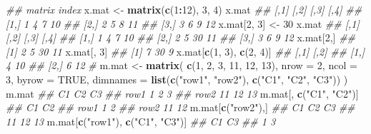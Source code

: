 \documentclass[
]{book}
\newenvironment{Shaded}{\begin{snugshade}}{\end{snugshade}}
\newcommand{\CommentTok}[1]{\textcolor[rgb]{0.56,0.35,0.01}{\textit{#1}}}
\newcommand{\DataTypeTok}[1]{\textcolor[rgb]{0.13,0.29,0.53}{#1}}
\newcommand{\DecValTok}[1]{\textcolor[rgb]{0.00,0.00,0.81}{#1}}
\newcommand{\KeywordTok}[1]{\textcolor[rgb]{0.13,0.29,0.53}{\textbf{#1}}}
\newcommand{\NormalTok}[1]{#1}
\newcommand{\OperatorTok}[1]{\textcolor[rgb]{0.81,0.36,0.00}{\textbf{#1}}}
\newcommand{\OtherTok}[1]{\textcolor[rgb]{0.56,0.35,0.01}{#1}}
\newcommand{\StringTok}[1]{\textcolor[rgb]{0.31,0.60,0.02}{#1}}
\begin{document}
\begin{Shaded}
\begin{Highlighting}[]
\CommentTok{\#\# matrix index}
\NormalTok{x.mat \textless{}{-}}\StringTok{ }\KeywordTok{matrix}\NormalTok{(}\KeywordTok{c}\NormalTok{(}\DecValTok{1}\OperatorTok{:}\DecValTok{12}\NormalTok{), }\DecValTok{3}\NormalTok{, }\DecValTok{4}\NormalTok{)}
\NormalTok{x.mat}
\CommentTok{\#\#      [,1] [,2] [,3] [,4]}
\CommentTok{\#\# [1,]    1    4    7   10}
\CommentTok{\#\# [2,]    2    5    8   11}
\CommentTok{\#\# [3,]    3    6    9   12}
\NormalTok{x.mat[}\DecValTok{2}\NormalTok{, }\DecValTok{3}\NormalTok{] \textless{}{-}}\StringTok{ }\DecValTok{30}
\NormalTok{x.mat}
\CommentTok{\#\#      [,1] [,2] [,3] [,4]}
\CommentTok{\#\# [1,]    1    4    7   10}
\CommentTok{\#\# [2,]    2    5   30   11}
\CommentTok{\#\# [3,]    3    6    9   12}
\NormalTok{x.mat[}\DecValTok{2}\NormalTok{,]}
\CommentTok{\#\# [1]  2  5 30 11}
\NormalTok{x.mat[, }\DecValTok{3}\NormalTok{]}
\CommentTok{\#\# [1]  7 30  9}
\NormalTok{x.mat[}\KeywordTok{c}\NormalTok{(}\DecValTok{1}\NormalTok{, }\DecValTok{3}\NormalTok{), }\KeywordTok{c}\NormalTok{(}\DecValTok{2}\NormalTok{, }\DecValTok{4}\NormalTok{)]}
\CommentTok{\#\#      [,1] [,2]}
\CommentTok{\#\# [1,]    4   10}
\CommentTok{\#\# [2,]    6   12}
\CommentTok{\#}
\NormalTok{m.mat \textless{}{-}}\StringTok{ }\KeywordTok{matrix}\NormalTok{(}
  \KeywordTok{c}\NormalTok{(}\DecValTok{1}\NormalTok{, }\DecValTok{2}\NormalTok{, }\DecValTok{3}\NormalTok{, }\DecValTok{11}\NormalTok{, }\DecValTok{12}\NormalTok{, }\DecValTok{13}\NormalTok{),}
  \DataTypeTok{nrow =} \DecValTok{2}\NormalTok{,}
  \DataTypeTok{ncol =} \DecValTok{3}\NormalTok{,}
  \DataTypeTok{byrow =} \OtherTok{TRUE}\NormalTok{,}
  \DataTypeTok{dimnames =} \KeywordTok{list}\NormalTok{(}\KeywordTok{c}\NormalTok{(}\StringTok{"row1"}\NormalTok{, }\StringTok{"row2"}\NormalTok{),}
                  \KeywordTok{c}\NormalTok{(}\StringTok{"C1"}\NormalTok{, }\StringTok{"C2"}\NormalTok{, }\StringTok{"C3"}\NormalTok{))}
\NormalTok{)}
\NormalTok{m.mat}
\CommentTok{\#\#      C1 C2 C3}
\CommentTok{\#\# row1  1  2  3}
\CommentTok{\#\# row2 11 12 13}
\NormalTok{m.mat[, }\KeywordTok{c}\NormalTok{(}\StringTok{"C1"}\NormalTok{, }\StringTok{"C2"}\NormalTok{)]}
\CommentTok{\#\#      C1 C2}
\CommentTok{\#\# row1  1  2}
\CommentTok{\#\# row2 11 12}
\NormalTok{m.mat[}\KeywordTok{c}\NormalTok{(}\StringTok{"row2"}\NormalTok{),]}
\CommentTok{\#\# C1 C2 C3 }
\CommentTok{\#\# 11 12 13}
\NormalTok{m.mat[}\KeywordTok{c}\NormalTok{(}\StringTok{"row1"}\NormalTok{), }\KeywordTok{c}\NormalTok{(}\StringTok{"C1"}\NormalTok{, }\StringTok{"C3"}\NormalTok{)]}
\CommentTok{\#\# C1 C3 }
\CommentTok{\#\#  1  3}
\end{Highlighting}
\end{Shaded}
\end{document}
